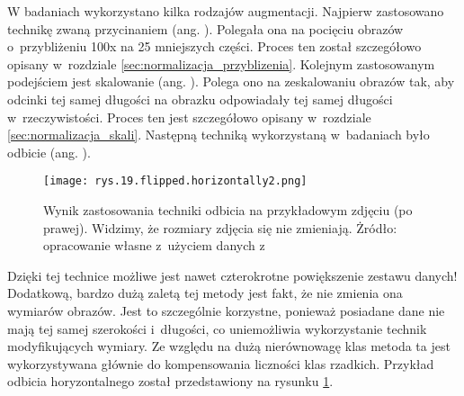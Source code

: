 W badaniach wykorzystano kilka rodzajów augmentacji. Najpierw zastosowano technikę zwaną przycinaniem (ang. ). Polegała ona na pocięciu obrazów o~przybliżeniu 100x na 25 mniejszych części. Proces ten został szczegółowo opisany w~rozdziale \ref{sec:normalizacja_przyblizenia}. Kolejnym zastosowanym podejściem jest skalowanie (ang. ).  Polega ono na zeskalowaniu obrazów tak, aby odcinki tej samej długości na obrazku odpowiadały tej samej długości w~rzeczywistości. Proces ten jest szczegółowo opisany w~rozdziale \ref{sec:normalizacja_skali}. Następną techniką wykorzystaną w~badaniach było odbicie (ang. ).
\begin{figure}[h]
    \centering
    \texttt{[image: rys.19.flipped.horizontally2.png]}
    \caption{Wynik zastosowania techniki odbicia na przykładowym zdjęciu (po prawej). Widzimy, że rozmiary zdjęcia się nie zmieniają.  Żródło: opracowanie własne z~użyciem danych z~\cite{Pirowski17}}
    \label{fig:mesh19}
\end{figure}
Dzięki tej technice możliwe jest nawet czterokrotne powiększenie zestawu danych! Dodatkową, bardzo dużą zaletą tej metody jest fakt, że nie zmienia ona wymiarów obrazów. Jest to szczególnie korzystne, ponieważ posiadane  dane nie mają tej samej szerokości i~długości, co uniemożliwia wykorzystanie technik modyfikujących wymiary. Ze względu na dużą nierównowagę klas metoda ta jest wykorzystywana głównie do kompensowania liczności klas rzadkich. Przykład odbicia horyzontalnego został przedstawiony na rysunku \ref{fig:mesh19}.















